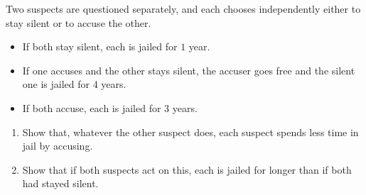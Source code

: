 Two suspects are questioned separately, and each chooses independently either to stay silent or to accuse the other.
\begin{itemize}
\item If both stay silent, each is jailed for $1$ year.
\item If one accuses and the other stays silent, the accuser goes free and the silent one is jailed for $4$ years.
\item If both accuse, each is jailed for $3$ years.
\end{itemize}
\begin{enumerate}
\item[(a)] Show that, whatever the other suspect does, each suspect spends less time in jail by accusing.
\item[(b)] Show that if both suspects act on this, each is jailed for longer than if both had stayed silent.
\end{enumerate}
